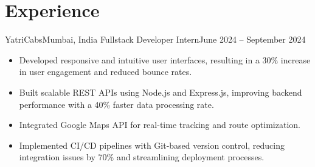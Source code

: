 \section{Experience}
\resumeSubHeadingListStart

  \resumeSubheading
    {YatriCabs}{Mumbai, India}
    {Fullstack Developer Intern}{June 2024 -- September 2024}
    \begin{itemize}[leftmargin=1em]
      \item Developed responsive and intuitive user interfaces, resulting in a 30\% increase in user engagement and reduced bounce rates.
      \item Built scalable REST APIs using Node.js and Express.js, improving backend performance with a 40\% faster data processing rate.
      \item Integrated Google Maps API for real-time tracking and route optimization.
      \item Implemented CI/CD pipelines with Git-based version control, reducing integration issues by 70\% and streamlining deployment processes.
    \end{itemize}

\resumeSubHeadingListEnd
